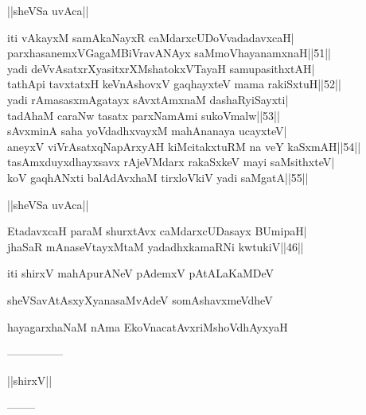 \documentclass{article}
\begin{document}
\begin{center}
||sheVSa uvAca||
\end{center}

iti vAkayxM samAkaNayxR caMdarxcUDoVvadadavxcaH|\\
parxhasanemxVGagaMBiVravANAyx saMmoVhayanamxnaH||51||\\
yadi deVvAsatxrXyasitxrXMshatokxVTayaH samupasithxtAH|\\
tathApi tavxtatxH keVnAshovxV gaqhayxteV mama rakiSxtuH||52||\\
yadi rAmasasxmAgatayx sAvxtAmxnaM dashaRyiSayxti|\\
tadAhaM caraNw tasatx parxNamAmi sukoVmalw||53||\\
sAvxminA saha yoVdadhxvayxM mahAnanaya ucayxteV|\\
aneyxV viVrAsatxqNapArxyAH kiMcitakxtuRM na veY kaSxmAH||54||\\
tasAmxduyxdhayxsavx rAjeVMdarx rakaSxkeV mayi saMsithxteV|\\
koV gaqhANxti balAdAvxhaM tirxloVkiV yadi saMgatA||55||\\

\begin{center}
||sheVSa uvAca||
\end{center}

EtadavxcaH paraM shurxtAvx caMdarxcUDasayx BUmipaH|\\
j{ha}SaR mAnaseVtayxMtaM yadadhxkamaRNi kwtukiV||46||\\

\begin{center}
iti shirxV mahApurANeV pAdemxV pAtALaKaMDeV
\end{center}

\begin{center}
sheVSavAtAsxyXyanasaMvAdeV somAshavxmeVdheV
\end{center}

\begin{center}
hayagarxhaNaM nAma EkoVnacatAvxriMshoVdhAyxyaH
\end{center}

\begin{center}
---------------
\end{center}

\begin{center}
||shirxV||
\end{center}

\begin{center}
--------
\end{center}
\end{document}
